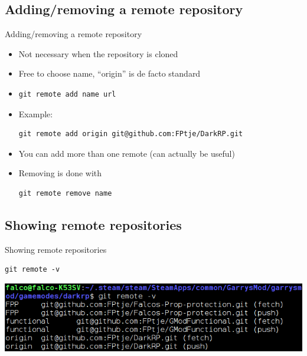 \documentclass[10pt,a4paper]{beamer}
\begin{document}
\subsection{Adding/removing a remote repository}
\begin{frame}[fragile]{Adding/removing a remote repository}
\begin{itemize}
\item Not necessary when the repository is cloned
\item Free to choose name, ``origin'' is de facto standard
\item \begin{verbatim}git remote add name url\end{verbatim}
\item Example:
\begin{verbatim}git remote add origin git@github.com:FPtje/DarkRP.git\end{verbatim}
\item You can add more than one remote (can actually be useful)
\item Removing is done with
\begin{verbatim}git remote remove name\end{verbatim}
\end{itemize}
\end{frame}

\subsection{Showing remote repositories}
\begin{frame}[fragile]{Showing remote repositories}
\begin{verbatim}git remote -v\end{verbatim}
\includegraphics[width=\linewidth]{gitremote.png}
\end{frame}
\end{document}
